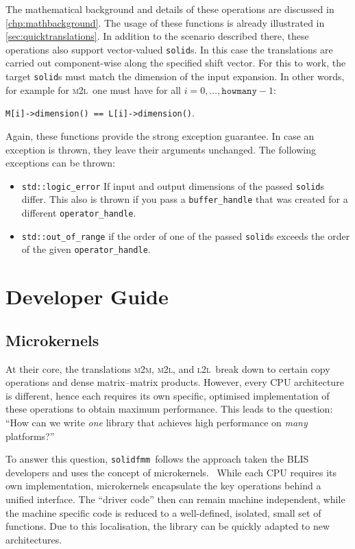 \documentclass{scrbook}
\newcommand{\solidfmm}{\texttt{solidfmm}}
\newcommand{\MtoM}{\textsc{m2m}}
\newcommand{\MtoL}{\textsc{m2l}}
\newcommand{\LtoL}{\textsc{l2l}}
\begin{document}
The mathematical background and details of these operations are discussed in
\cref{chp:mathbackground}. The usage of these functions is already illustrated
in \cref{sec:quicktranslations}. In addition to the scenario described there,
these operations also support vector-valued \lstinline|solid|s. In this case
the translations are carried out component-wise along the specified shift
vector. For this to work, the target \lstinline|solid|s must match the
dimension of the input expansion. In other words, for example for 
\MtoL\ one must have for all $i=0,\dotsc,\mathtt{howmany}-1$:
\begin{center}
\lstinline|M[i]->dimension() == L[i]->dimension()|.
\end{center}

Again, these functions provide the strong exception guarantee. In case an
exception is thrown, they leave their arguments unchanged. The following
exceptions can be thrown:
\begin{itemize}
\item \lstinline|std::logic_error| If input and output dimensions of the passed
\lstinline|solid|s differ. This also is thrown if you pass a
\lstinline|buffer_handle| that was created for a different
\lstinline|operator_handle|.
\item \lstinline|std::out_of_range| if the order of one of the passed
\lstinline|solid|s exceeds the order of the given \lstinline|operator_handle|.
\end{itemize}

\part{Developer Guide}\label{part:developer}

\chapter{Microkernels}
At their core, the translations \MtoM, \MtoL, and \LtoL\ break down to certain
copy operations and dense matrix--matrix products. However, every CPU
architecture is different, hence each requires its own specific, optimised
implementation of these operations to obtain maximum performance. This leads
to the question: \enquote{How can we write \emph{one} library that achieves
high performance on \emph{many} platforms?}

To answer this question, \solidfmm\ follows the approach taken the BLIS
developers and uses the concept of
microkernels.~\autocite{blispaper,laffproject} While each CPU requires its own
implementation, microkernels encapsulate the key operations behind a unified
interface. The \enquote{driver code} then can remain machine independent, while
the machine specific code is reduced to a well-defined, isolated, small
set of functions. Due to this localisation, the library can be quickly
adapted to new architectures.
\end{document}

